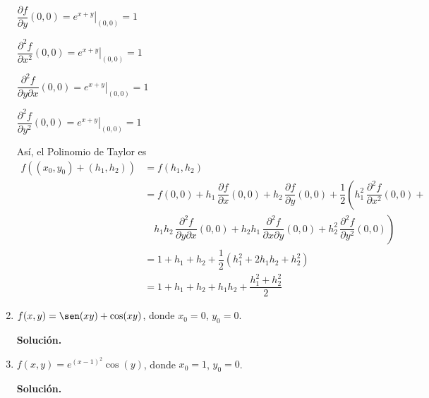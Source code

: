 \documentclass[fleqn, 12pt]{article}
\newcommand{\derivadaparcial}[2]{\dfrac{\partial {#1}}{\partial {#2}}}
\newcommand{\derivadaparcialn}[3]{\dfrac{\partial^{#3} {#1}}{\partial {#2}^{#3}}}
\newcommand{\derivadaparcialnd}[3]{\dfrac{\partial^{2} {#1}}{\partial {#3} \partial {#2}}}
\begin{document}
\begin{enumerate}
        $ \derivadaparcial{f}{y} (0,0) = \left. e^{x + y} \right|_{(0,0)} = 1 $

        $ \derivadaparcialn{f}{x}{2} (0,0) = \left. e^{x + y} \right|_{(0,0)} = 1 $

        $ \derivadaparcialnd{f}{x}{y} (0,0) = \left. e^{x + y} \right|_{(0,0)} = 1 $

        $ \derivadaparcialn{f}{y}{2} (0,0) = \left. e^{x + y} \right|_{(0,0)} = 1 $

        Así, el Polinomio de Taylor es
        \begin{align*}
            f((x_0, y_0) + (h_1, h_2)) &= f(h_1, h_2) \\
            &= f(0,0) + h_1 \, \derivadaparcial{f}{x} (0,0) + h_2 \, \derivadaparcial{f}{y} (0,0) + \dfrac{1}{2} \left( h_1^2 \, \derivadaparcialn{f}{x}{2} (0,0) \right. + \\
            & \quad \left. h_1 h_2 \, \derivadaparcialnd{f}{x}{y} (0,0) + h_2 h_1 \, \derivadaparcialnd{f}{y}{x} (0,0) + h_2^2 \, \derivadaparcialn{f}{y}{2} (0,0) \right) \\
            &= 1 + h_1 + h_2 + \dfrac{1}{2} \left( h_1^2 + 2 h_1 h_2 + h_2^2 \right) \\
            &= 1 + h_1 + h_2 + h_1 h_2 + \dfrac{h_1^2 + h_2^2}{2}
        \end{align*}

        \item $ f(x,y) = \sen (xy) + \cos (xy) $, donde $ x_0 = 0 $, $ y_0 = 0 $.
        
        \textbf{Solución.}


        \item $ f(x,y) = e^{(x - 1)^2} \cos (y) $, donde $ x_0 = 1 $, $ y_0 = 0 $.
        
        \textbf{Solución.}


    \end{enumerate}
\end{document}
